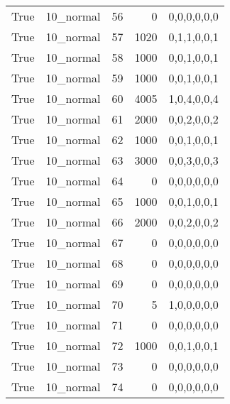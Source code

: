 \begin{tabular}{llrrl}
 True            & 10\_normal           &            56 &                     0 & 0,0,0,0,0,0   \\
 True            & 10\_normal           &            57 &                  1020 & 0,1,1,0,0,1   \\
 True            & 10\_normal           &            58 &                  1000 & 0,0,1,0,0,1   \\
 True            & 10\_normal           &            59 &                  1000 & 0,0,1,0,0,1   \\
 True            & 10\_normal           &            60 &                  4005 & 1,0,4,0,0,4   \\
 True            & 10\_normal           &            61 &                  2000 & 0,0,2,0,0,2   \\
 True            & 10\_normal           &            62 &                  1000 & 0,0,1,0,0,1   \\
 True            & 10\_normal           &            63 &                  3000 & 0,0,3,0,0,3   \\
 True            & 10\_normal           &            64 &                     0 & 0,0,0,0,0,0   \\
 True            & 10\_normal           &            65 &                  1000 & 0,0,1,0,0,1   \\
 True            & 10\_normal           &            66 &                  2000 & 0,0,2,0,0,2   \\
 True            & 10\_normal           &            67 &                     0 & 0,0,0,0,0,0   \\
 True            & 10\_normal           &            68 &                     0 & 0,0,0,0,0,0   \\
 True            & 10\_normal           &            69 &                     0 & 0,0,0,0,0,0   \\
 True            & 10\_normal           &            70 &                     5 & 1,0,0,0,0,0   \\
 True            & 10\_normal           &            71 &                     0 & 0,0,0,0,0,0   \\
 True            & 10\_normal           &            72 &                  1000 & 0,0,1,0,0,1   \\
 True            & 10\_normal           &            73 &                     0 & 0,0,0,0,0,0   \\
 True            & 10\_normal           &            74 &                     0 & 0,0,0,0,0,0   \\

\end{tabular}
